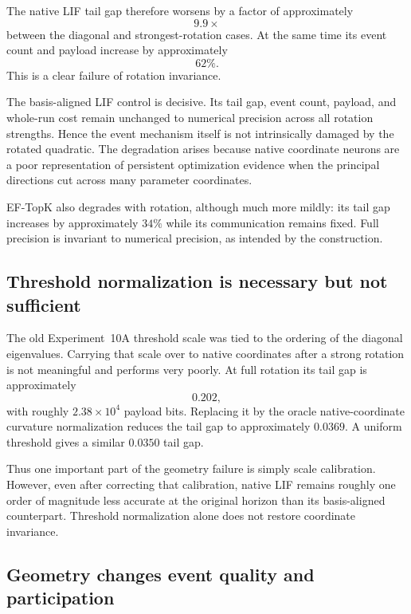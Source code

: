 The native LIF tail gap therefore worsens by a factor of approximately
\begin{equation}
  \boxed{9.9\times}
\end{equation}
between the diagonal and strongest-rotation cases. At the same time its event count and payload increase by approximately
\begin{equation}
  \boxed{62\%}.
\end{equation}
This is a clear failure of rotation invariance.

The basis-aligned LIF control is decisive. Its tail gap, event count, payload, and whole-run cost remain unchanged to numerical precision across all rotation strengths. Hence the event mechanism itself is not intrinsically damaged by the rotated quadratic. The degradation arises because native coordinate neurons are a poor representation of persistent optimization evidence when the principal directions cut across many parameter coordinates.

EF-TopK also degrades with rotation, although much more mildly: its tail gap increases by approximately $34\%$ while its communication remains fixed. Full precision is invariant to numerical precision, as intended by the construction.

\subsection{Threshold normalization is necessary but not sufficient}

The old Experiment~10A threshold scale was tied to the ordering of the diagonal eigenvalues. Carrying that scale over to native coordinates after a strong rotation is not meaningful and performs very poorly. At full rotation its tail gap is approximately
\begin{equation}
  0.202,
\end{equation}
with roughly $2.38\times10^4$ payload bits. Replacing it by the oracle native-coordinate curvature normalization reduces the tail gap to approximately $0.0369$. A uniform threshold gives a similar $0.0350$ tail gap.

Thus one important part of the geometry failure is simply scale calibration. However, even after correcting that calibration, native LIF remains roughly one order of magnitude less accurate at the original horizon than its basis-aligned counterpart. Threshold normalization alone does not restore coordinate invariance.

\subsection{Geometry changes event quality and participation}

